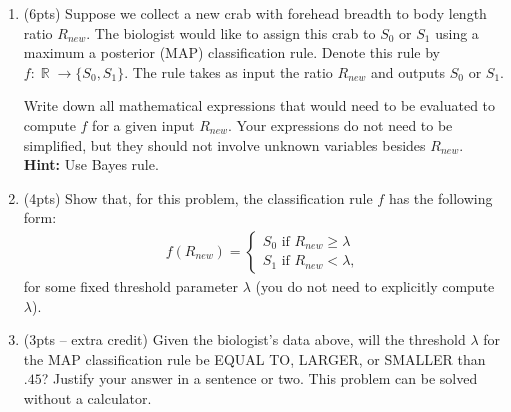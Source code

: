 \documentclass[10pt]{article}
\DeclareMathOperator{\R}{\mathbb{R}}
\begin{document}
\begin{enumerate}[label=(\alph*)]
	\item (6pts) Suppose we collect a new crab with forehead breadth to body length ratio $R_{new}$.  The biologist would like to assign this crab to $S_0$ or $S_1$ using a maximum a posterior (MAP) classification rule. Denote this rule by $f: \R\rightarrow \{S_0,S_1\}$. The rule takes as input the ratio $R_{new}$ and outputs $S_0$ or $S_1$.
	
	Write down all mathematical expressions that would need to be evaluated to compute $f$ for a given input $R_{new}$. Your expressions do not need to be simplified, but they should not involve unknown variables besides $R_{new}$. \textbf{Hint:} Use Bayes rule.
	
	\vspace{16em}
	
	\item (4pts) Show that, for this problem, the classification rule $f$ has the following form:
	\begin{align*}
	f(R_{new}) = \begin{cases}
	S_0 \text{ if } R_{new} \geq \lambda \\
	S_1 \text{ if } R_{new} < \lambda,
	\end{cases}
	\end{align*}
	for some fixed threshold parameter $\lambda$ (you do not need to explicitly compute $\lambda$).
	\vspace{12em}
	
	\item (3pts -- extra credit) Given the biologist's data above, will the threshold $\lambda$ for the MAP classification rule be EQUAL TO, LARGER, or SMALLER than $.45$? Justify your answer in a sentence or two. This problem can be solved without a calculator. 
	
\end{enumerate}
\end{document}
